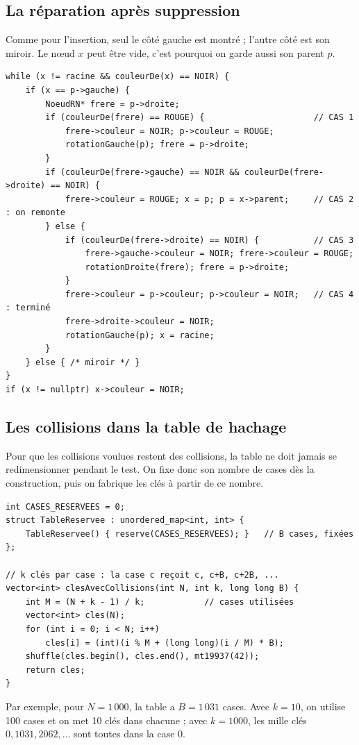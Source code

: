\documentclass[12pt,a4paper]{report}
\begin{document}
\subsection{La réparation après suppression}
Comme pour l'insertion, seul le côté gauche est montré ; l'autre côté est son miroir. Le nœud $x$ peut être vide, c'est pourquoi on garde aussi son parent $p$.
\begin{lstlisting}
while (x != racine && couleurDe(x) == NOIR) {
    if (x == p->gauche) {
        NoeudRN* frere = p->droite;
        if (couleurDe(frere) == ROUGE) {                      // CAS 1
            frere->couleur = NOIR; p->couleur = ROUGE;
            rotationGauche(p); frere = p->droite;
        }
        if (couleurDe(frere->gauche) == NOIR && couleurDe(frere->droite) == NOIR) {
            frere->couleur = ROUGE; x = p; p = x->parent;     // CAS 2 : on remonte
        } else {
            if (couleurDe(frere->droite) == NOIR) {           // CAS 3
                frere->gauche->couleur = NOIR; frere->couleur = ROUGE;
                rotationDroite(frere); frere = p->droite;
            }
            frere->couleur = p->couleur; p->couleur = NOIR;   // CAS 4 : terminé
            frere->droite->couleur = NOIR;
            rotationGauche(p); x = racine;
        }
    } else { /* miroir */ }
}
if (x != nullptr) x->couleur = NOIR;
\end{lstlisting}

\subsection{Les collisions dans la table de hachage}
Pour que les collisions voulues restent des collisions, la table ne doit jamais se redimensionner pendant le test. On fixe donc son nombre de cases dès la construction, puis on fabrique les clés à partir de ce nombre.
\begin{lstlisting}
int CASES_RESERVEES = 0;
struct TableReservee : unordered_map<int, int> {
    TableReservee() { reserve(CASES_RESERVEES); }   // B cases, fixées
};

// k clés par case : la case c reçoit c, c+B, c+2B, ...
vector<int> clesAvecCollisions(int N, int k, long long B) {
    int M = (N + k - 1) / k;            // cases utilisées
    vector<int> cles(N);
    for (int i = 0; i < N; i++)
        cles[i] = (int)(i % M + (long long)(i / M) * B);
    shuffle(cles.begin(), cles.end(), mt19937(42));
    return cles;
}
\end{lstlisting}
Par exemple, pour $N = 1\,000$, la table a $B = 1\,031$ cases. Avec $k = 10$, on utilise 100 cases et on met 10 clés dans chacune ; avec $k = 1000$, les mille clés $0, 1031, 2062, \dots$ sont toutes dans la case 0.
\end{document}

